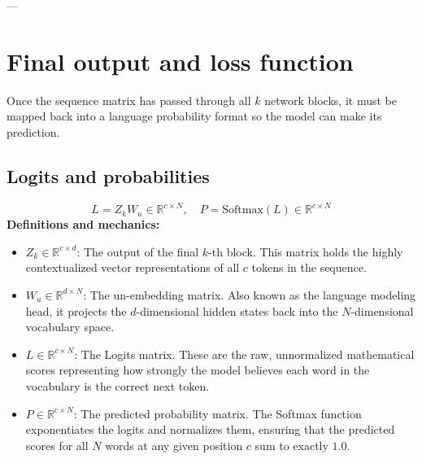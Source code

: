\documentclass[11pt]{article}
\begin{document}
	---
	
	\section{Final output and loss function}
	Once the sequence matrix has passed through all $k$ network blocks, it must be mapped back into a language probability format so the model can make its prediction.
	
	\subsection{Logits and probabilities}
	\begin{equation}
		L = Z_k W_u \in \mathbb{R}^{c \times N}, \quad P = \text{Softmax}(L) \in \mathbb{R}^{c \times N}
	\end{equation}
	\textbf{Definitions and mechanics:}
	\begin{itemize}
		\item $Z_k \in \mathbb{R}^{c \times d}$: The output of the final $k$-th block.
		This matrix holds the highly contextualized vector representations of all $c$ tokens in the sequence.
		\item $W_u \in \mathbb{R}^{d \times N}$: The un-embedding matrix. Also known as the language modeling head, it projects the $d$-dimensional hidden states back into the $N$-dimensional vocabulary space.
		\item $L \in \mathbb{R}^{c \times N}$: The Logits matrix. These are the raw, unnormalized mathematical scores representing how strongly the model believes each word in the vocabulary is the correct next token.
		\item $P \in \mathbb{R}^{c \times N}$: The predicted probability matrix.
		The Softmax function exponentiates the logits and normalizes them, ensuring that the predicted scores for all $N$ words at any given position $c$ sum to exactly $1.0$.
	\end{itemize}
	
\end{document}
